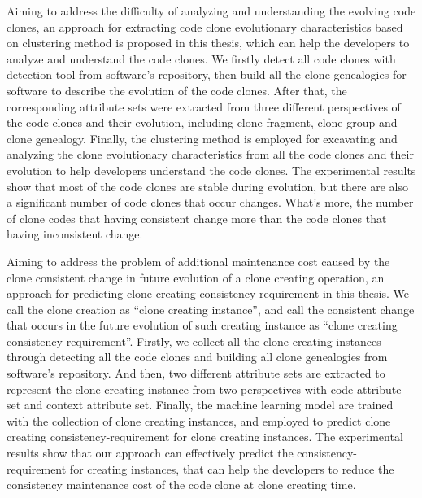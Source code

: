 {Aiming to address the difficulty of analyzing and understanding the evolving code clones, an  approach for extracting code clone evolutionary characteristics based on clustering method is proposed in this thesis, which can help the developers to analyze and understand the code clones.
We firstly detect all code clones with detection tool from software's repository, then build all the clone genealogies for software to describe the evolution of the code clones.
After that, the corresponding attribute sets were extracted from three different perspectives of the code clones and their evolution, including clone fragment, clone group and clone genealogy. 
Finally, the clustering method is employed for excavating and analyzing the clone evolutionary characteristics from all the code clones and their evolution to help developers understand the code clones. 
The experimental results show that most of the code clones are stable during evolution, but there are also a significant number of code clones that occur changes. 
What's more, the number of clone codes that having consistent change more than the code clones that having inconsistent change.

Aiming to address the problem of additional maintenance cost caused by the clone consistent change in future evolution of a clone creating operation, an approach for predicting clone creating consistency-requirement in this thesis.
We call the clone creation as ``clone creating instance'', and call the consistent change that occurs in the future evolution of such creating instance as ``clone creating consistency-requirement''.
Firstly, we collect all the clone creating instances through detecting all the code clones and building all clone genealogies from software's repository.
And then, two different attribute sets are extracted to represent the clone creating instance from two perspectives with code attribute set and context attribute set.
Finally, the machine learning model are trained with the collection of clone creating instances, and employed to predict clone creating consistency-requirement for clone creating instances. 
The experimental results show that our approach can effectively predict the consistency-requirement for creating instances, that can help the developers to reduce the consistency maintenance cost of the code clone at clone creating time.

}
